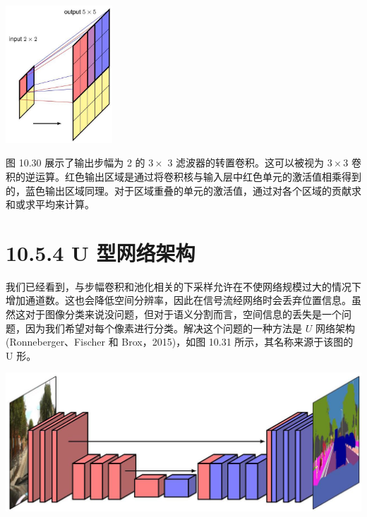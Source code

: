 \documentclass[10pt]{report}
\begin{document}
\begin{center}
\includegraphics[max width=0.3\textwidth]{images/0194e279-9b28-703a-88f4-c3ac21e2010d_338_1070_349_486_626_0.jpg}
\end{center}
\hspace*{3em} 

图 10.30 展示了输出步幅为 2 的 \(3 \times\) 3 滤波器的转置卷积。这可以被视为 \(3 \times  3\) 卷积的逆运算。红色输出区域是通过将卷积核与输入层中红色单元的激活值相乘得到的，蓝色输出区域同理。对于区域重叠的单元的激活值，通过对各个区域的贡献求和或求平均来计算。

\section*{10.5.4 U 型网络架构}

我们已经看到，与步幅卷积和池化相关的下采样允许在不使网络规模过大的情况下增加通道数。这也会降低空间分辨率，因此在信号流经网络时会丢弃位置信息。虽然这对于图像分类来说没问题，但对于语义分割而言，空间信息的丢失是一个问题，因为我们希望对每个像素进行分类。解决这个问题的一种方法是 \(U\) 网络架构(Ronneberger、Fischer 和 Brox，2015)，如图 10.31 所示，其名称来源于该图的 U 形。

\begin{center}
\includegraphics[max width=1.0\textwidth]{images/0194e279-9b28-703a-88f4-c3ac21e2010d_338_272_1411_1279_499_0.jpg}
\end{center}
\hspace*{3em} 
\end{document}
